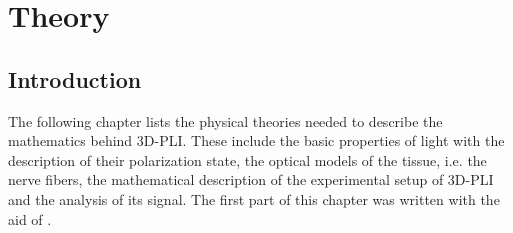 \setcounter{chapter}{2}
\chapter{Theory}
\label{sec:theory}
% 
%
\section{Introduction}
The following chapter lists the physical theories needed to describe the mathematics behind \ac{3D-PLI}.
These include the basic properties of light with the description of their polarization state, the optical models of the tissue, i.e. the nerve fibers, the mathematical description of the experimental setup of \ac{3D-PLI} and the analysis of its signal.
The first part of this chapter was written with the aid of \cite{demtroeder2, Fliebach2012}.
% 
% 
% 
